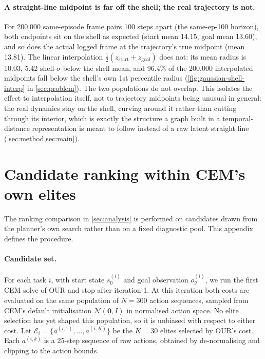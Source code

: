 \documentclass{article} %
\begin{document}
\paragraph{A straight-line midpoint is far off the shell; the real trajectory is not.} For 200{,}000
same-episode frame pairs 100 steps apart (the same-ep-100 horizon), both endpoints sit on the
shell as expected (start mean 14.15, goal mean 13.60), and so does the actual logged frame at the
trajectory's true midpoint (mean 13.81). The linear interpolation
$\tfrac12(z_{\mathrm{start}}+z_{\mathrm{goal}})$ does not: its mean radius is 10.03, 5.42
shell-$\sigma$ below the shell mean, and 96.4\% of the 200{,}000 interpolated midpoints fall below
the shell's own 1st percentile radius (\cref{fig:gaussian-shell-interp} in \cref{sec:problem}). The two populations do
not overlap. This isolates the effect to interpolation itself, not to trajectory midpoints being
unusual in general: the real dynamics stay on the shell, curving around it rather than cutting
through its interior, which is exactly the structure a graph built in a temporal-distance
representation is meant to follow instead of a raw latent straight line
(\cref{sec:method,sec:main}).



\section{Candidate ranking within CEM's own elites}
\label{app:cem-trace}
The ranking comparison in \cref{sec:analysis} is performed on candidates drawn from the planner's
own search rather than on a fixed diagnostic pool. This appendix defines the procedure.

\paragraph{Candidate set.} For each task $i$, with start state $s_0^{(i)}$ and goal observation
$o_g^{(i)}$, we run the first CEM solve of OUR and stop after iteration 1. At this iteration
both costs are evaluated on the same population of $N=300$ action sequences, sampled from
CEM's default initialisation $\mathcal{N}(\mathbf{0}, I)$ in normalised action space. No elite
selection has yet shaped this population, so it is unbiased with respect to either cost. Let
$\mathcal{E}_i = \{a^{(i,1)}, \dots, a^{(i,K)}\}$ be the $K=30$ elites selected by OUR's cost.
Each $a^{(i,k)}$ is a 25-step sequence of raw actions, obtained by de-normalising and clipping
to the action bounds.
\end{document}
